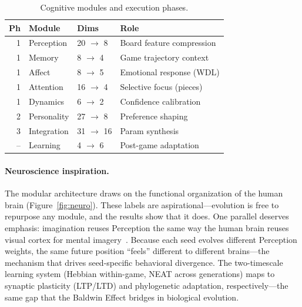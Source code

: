 \documentclass[11pt,a4paper]{article}
\begin{document}
\begin{table}[t]
\caption{Cognitive modules and execution phases.}
\label{tab:modules}
\centering
\footnotesize
\begin{tabular}{@{}rlll@{}}
\toprule
Ph & Module & Dims & Role \\
\midrule
1 & Perception & 20 $\to$ 8 & Board feature compression \\
1 & Memory & 8 $\to$ 4 & Game trajectory context \\
1 & Affect & 8 $\to$ 5 & Emotional response (WDL) \\
1 & Attention & 16 $\to$ 4 & Selective focus (pieces) \\
1 & Dynamics & 6 $\to$ 2 & Confidence calibration \\
\midrule
2 & Personality & 27 $\to$ 8 & Preference shaping \\
3 & Integration & 31 $\to$ 16 & Param synthesis \\
-- & Learning & 4 $\to$ 6 & Post-game adaptation \\
\bottomrule
\end{tabular}
\end{table}

\paragraph{Neuroscience inspiration.}
The modular architecture draws on the functional organization of the human brain (Figure~\ref{fig:neuro}).
These labels are aspirational---evolution is free to repurpose any module, and the results show that it does.
One parallel deserves emphasis: imagination reuses Perception the same way the human brain reuses visual cortex for mental imagery~\citep{kosslyn2001neural}.
Because each seed evolves different Perception weights, the same future position ``feels'' different to different brains---the mechanism that drives seed-specific behavioral divergence.
The two-timescale learning system (Hebbian within-game, NEAT across generations) maps to synaptic plasticity (LTP/LTD) and phylogenetic adaptation, respectively---the same gap that the Baldwin Effect bridges in biological evolution.
\end{document}
